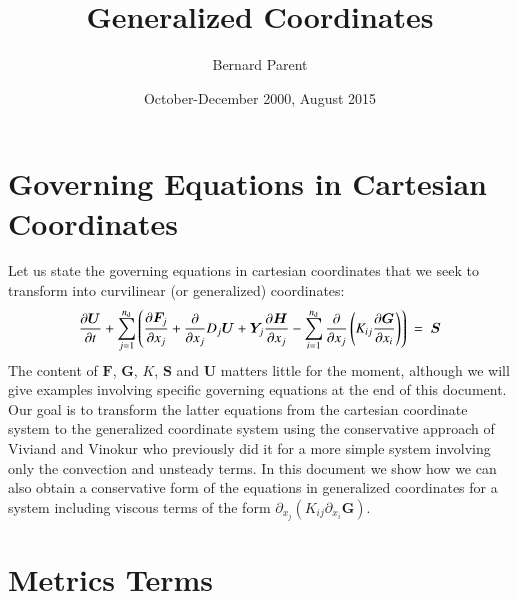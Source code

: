 \documentclass{warpdoc}
\author{
  Bernard Parent
}
\title{
  Generalized Coordinates
}
\date{
October-December 2000, August 2015
}
\newcommand{\nd}{{{n}_{\rm d}}}
\renewcommand{\vec}[1]{\bm{#1}}
\begin{document}
  \pagestyle{headings}
  \setcounter{page}{1}
  \makewarpdoctitle
  \tableofcontents





\section{Governing Equations in Cartesian Coordinates}

Let us state the governing equations  in cartesian coordinates
that we seek to transform into curvilinear (or generalized)
coordinates:
%
\begin{equation}
\frac{\partial \vec{U}}{\partial t} + \sum_{j=1}^\nd \left( 
  \frac{\partial \vec{F}_j}{\partial x_j}
+ \frac{\partial }{\partial x_j}D_j \vec{U}
+ \vec{Y}_j \frac{\partial \vec{H}}{\partial x_j}
 - \sum_{i=1}^\nd  \frac{\partial }{\partial x_j}
     \left( K_{ij} \frac{\partial \vec{G}}{\partial x_i} \right)\right)
 ~=~\vec{S}
 \label{eqn:goveq}
\end{equation}
%
The content of $\vec{F}$, $\vec{G}$, $K$, $\vec{S}$ and $\vec{U}$ matters little for the moment, although
we will give examples involving specific governing equations  at the end of this document.
Our goal is to transform the latter equations  from
the cartesian coordinate system to the generalized
coordinate system using the conservative approach of Viviand \cite{gen:viviand}
and Vinokur \cite{gen:vinokur} who previously did it for a more simple system involving only the convection and unsteady terms. In this document we show how we can also obtain a conservative form of the equations  in generalized coordinates for a system including viscous terms of the form $\partial_{x_j} (K_{ij} \partial_{x_i} \vec{G})$.  



\section{Metrics Terms}
\end{document}
